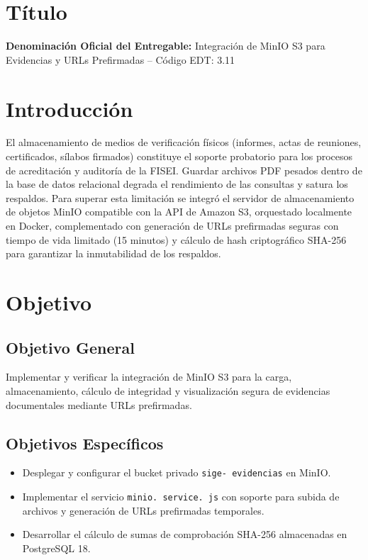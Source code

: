 \documentclass[12pt,a4paper]{article}
\begin{document}
\section{Título}
\textbf{Denominación Oficial del Entregable:} Integración de MinIO S3 para Evidencias y URLs Prefirmadas -- Código EDT: 3.11

\section{Introducción}
El almacenamiento de medios de verificación físicos (informes, actas de reuniones, certificados, sílabos firmados) constituye el soporte probatorio para los procesos de acreditación y auditoría de la FISEI. Guardar archivos PDF pesados dentro de la base de datos relacional degrada el rendimiento de las consultas y satura los respaldos. Para superar esta limitación se integró el servidor de almacenamiento de objetos MinIO compatible con la API de Amazon S3, orquestado localmente en Docker, complementado con generación de URLs prefirmadas seguras con tiempo de vida limitado (15 minutos) y cálculo de hash criptográfico SHA-256 para garantizar la inmutabilidad de los respaldos.

\section{Objetivo}
\subsection{Objetivo General}
Implementar y verificar la integración de MinIO S3 para la carga, almacenamiento, cálculo de integridad y visualización segura de evidencias documentales mediante URLs prefirmadas.
\subsection{Objetivos Específicos}
\begin{itemize}[leftmargin=1.5em, itemsep=2pt]
    \item Desplegar y configurar el bucket privado \texttt{sige- evidencias} en MinIO.
    \item Implementar el servicio \texttt{minio. service. js} con soporte para subida de archivos y generación de URLs prefirmadas temporales.
    \item Desarrollar el cálculo de sumas de comprobación SHA-256 almacenadas en PostgreSQL 18.
\end{itemize}
\end{document}
